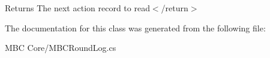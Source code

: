 \begin{DoxyReturn}{Returns}
The next action record to read$<$/return$>$ 
\end{DoxyReturn}


The documentation for this class was generated from the following file\-:\begin{DoxyCompactItemize}
\item 
M\-B\-C Core/M\-B\-C\-Round\-Log.\-cs\end{DoxyCompactItemize}
